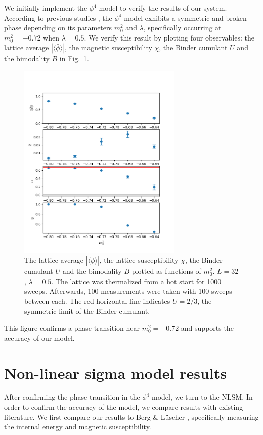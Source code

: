 We initially implement the $\phi^4$ model to verify the results of our system. According to previous studies \cite{monahan2016, schaich2006}, the $\phi^4$ model exhibits a symmetric and broken phase depending on its parameters $m_0^2$ and $\lambda$, specifically occurring at $m_0^2 = -0.72$ when $\lambda = 0.5$. We verify this result by plotting four observables: the lattice average $|\langle\bar\phi\rangle|$, the magnetic susceptibility $\chi$, the Binder cumulant $U$ and the bimodality $B$ in Fig.~\ref{fig:phi4}.
\begin{figure}[h]
    \centering
      \includegraphics[width=0.7\textwidth]{imgs/phi4.png}
      \caption{\label{fig:phi4} The lattice average $|\langle\bar\phi\rangle|$, the lattice susceptibility $\chi$, the Binder cumulant $U$ and the bimodality $B$ plotted as functions of $m_0^2$. $L=32$, $\lambda=0.5$. The lattice was thermalized from a hot start for 1000 sweeps. Afterwards, 100 measurements were taken with 100 sweeps between each. The red horizontal line indicates $U=2/3$, the symmetric limit of the Binder cumulant.}
\end{figure}
This figure confirms a phase transition near $m_0^2=-0.72$ and supports the accuracy of our model.

\section{Non-linear sigma model results}
After confirming the phase transition in the $\phi^4$ model, we turn to the NLSM. In order to confirm the accuracy of the model, we compare results with existing literature. We first compare our results to Berg \& L\"uscher \cite{berg1981}, specifically measuring the internal energy and magnetic susceptibility. 

